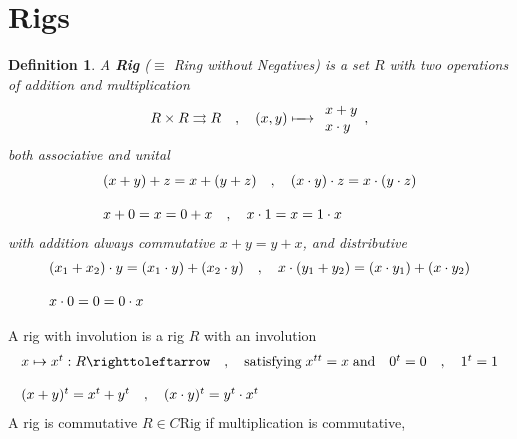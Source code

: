 \documentclass[leqno]{article}
\newcommand{\myemph}[1]{{\it{\bf{#1}}}}
\newtheorem{definition}[equation]{Definition} %
\numberwithin{equation}{section}
\begin{document}
\section{Rigs} \label{sec:2}
\begin{definition}
				A \myemph{Rig} ($\equiv$ Ring without Negatives) is a set $R$ with two
				operations of addition and multiplication 
				\begin{equation}
								R\times R \rightrightarrows R \quad , \quad (x,y)\xmapsto{\quad}
								\begin{array}[H]{l}
												x+y\\
												x\cdot y
								\end{array},
								\label{eq:2.1}
				\end{equation}
				both associative and unital 
				\begin{equation}
								\begin{array}[H]{lll}
												(x+y)+z=x+(y+z)\quad , \quad (x\cdot y)\cdot z = x\cdot (y\cdot z)
												\\\\
												x+0=x=0+x \quad , \quad x\cdot 1=x=1\cdot x
								\end{array}
								\label{eq:2.2}
				\end{equation}
				with addition always commutative $x+y=y+x$, and distributive 
				\begin{equation}
								\begin{array}[H]{l}
								(x_1+x_2)\cdot y = (x_1\cdot y)+(x_2\cdot y)\quad , \quad
								x\cdot(y_1+y_2)=(x\cdot y_1)+(x\cdot y_2) \\\\
								x\cdot 0 = 0 = 0\cdot x
								\end{array}
								\label{eq:2.3}
				\end{equation}
				\label{def:2.4}
\end{definition}
A rig with involution is a rig $R$ with an involution 
\begin{equation}
				\begin{array}[H]{l}
				x\mapsto x^{t}: R\righttoleftarrow \quad , \quad \text{satisfying}\; x^{tt}=x \;
				\text{and}\quad 0^{t}=0\quad , \quad 1^{t}=1 \\\\
				(x+y)^{t}= x^{t}+y^{t}\quad ,\quad (x\cdot y)^{t}=y^{t}\cdot x^{t}
				\end{array}
				\label{eq:2.5}
\end{equation}
A rig is commutative $R\in C\text{Rig}$ if multiplication is commutative,
\end{document}
